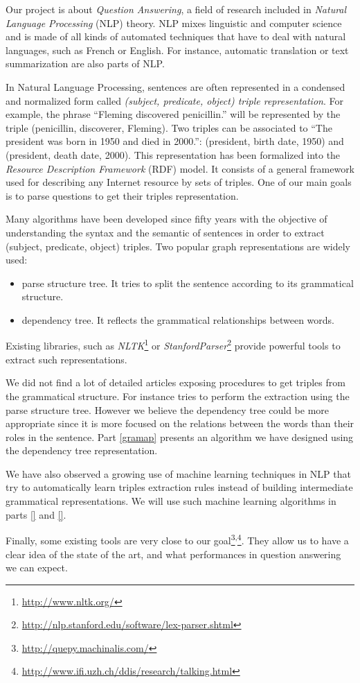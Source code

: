 Our project is about \textit{Question Answering}, a field of research included in \textit{Natural Language Processing} (NLP) theory. NLP mixes linguistic and computer science and is made of all kinds of automated techniques that have to deal with natural languages, such as French or English. For instance, automatic translation or text summarization are also parts of NLP.

In Natural Language Processing, sentences are often represented in a condensed and normalized form called \textit{(subject, predicate, object) triple representation}. For example, the phrase ``Fleming discovered penicillin.'' will be represented by the triple (penicillin, discoverer, Fleming). Two triples can be associated to ``The president was born in 1950 and died in 2000.'': (president, birth date, 1950) and (president, death date, 2000). This representation has been formalized into the \textit{Resource Description Framework} (RDF) model. It consists of a general framework used for describing any Internet resource by sets of triples. One of our main goals is to parse questions to get their triples representation.

Many algorithms have been developed since fifty years with the objective of understanding the syntax and the semantic of sentences in order to extract (subject, predicate, object) triples. Two popular graph representations are widely used:
\begin{itemize}
 \item parse structure tree. It tries to split the sentence according to its grammatical structure.
 \item dependency tree. It reflects the grammatical relationships between words.
\end{itemize}
Existing libraries, such as \textit{NLTK}\footnote{\url{http://www.nltk.org/}} or \textit{StanfordParser}\footnote{\url{http://nlp.stanford.edu/software/lex-parser.shtml}} provide powerful tools to extract such representations.

We did not find a lot of detailed articles exposing procedures to get triples from the grammatical structure. For instance \cite{parsetree} tries to perform the extraction using the parse structure tree. However we believe the dependency tree could be more appropriate since it is more focused on the relations between the words than their roles in the sentence. Part \ref{gramap} presents an algorithm we have designed using the dependency tree representation.

We have also observed a growing use of machine learning techniques in NLP that try to automatically learn triples extraction rules instead of building intermediate grammatical representations. We will use such machine learning algorithms in parts \ref{} and \ref{}.

Finally, some existing tools are very close to our goal\footnote{\url{http://quepy.machinalis.com/}}\textsuperscript{,}\footnote{\url{http://www.ifi.uzh.ch/ddis/research/talking.html}}. They allow us to have a clear idea of the state of the art, and what performances in question answering we can expect.
